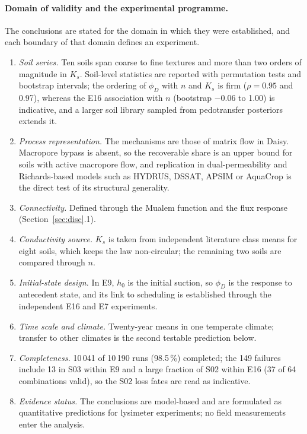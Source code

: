 \paragraph{Domain of validity and the experimental programme.}
The conclusions are stated for the domain in which they were established, and each boundary of that domain defines an experiment.
\begin{enumerate}[nosep]
\item \emph{Soil series.} Ten soils span coarse to fine textures and more than two orders of magnitude in $K_s$. Soil-level statistics are reported with permutation tests and bootstrap intervals; the ordering of $\phi_D$ with $n$ and $K_s$ is firm ($\rho=0.95$ and 0.97), whereas the E16 association with $n$ (bootstrap $-0.06$ to 1.00) is indicative, and a larger soil library sampled from pedotransfer posteriors extends it.
\item \emph{Process representation.} The mechanisms are those of matrix flow in Daisy. Macropore bypass \citep{Jarvis2007,Beven1982} is absent, so the recoverable share is an upper bound for soils with active macropore flow, and replication in dual-permeability and Richards-based models such as HYDRUS, DSSAT, APSIM or AquaCrop \citep{Simunek2008,Simunek2016,Jones2003,Keating2003,Steduto2009} is the direct test of its structural generality.
\item \emph{Connectivity.} Defined through the Mualem function and the flux response (Section~\ref{sec:disc}.1).
\item \emph{Conductivity source.} $K_s$ is taken from independent literature class means for eight soils, which keeps the law non-circular; the remaining two soils are compared through $n$.
\item \emph{Initial-state design.} In E9, $h_0$ is the initial suction, so $\phi_D$ is the response to antecedent state, and its link to scheduling is established through the independent E16 and E7 experiments.
\item \emph{Time scale and climate.} Twenty-year means in one temperate climate; transfer to other climates is the second testable prediction below.
\item \emph{Completeness.} 10\,041 of 10\,190 runs (98.5\,\%) completed; the 149 failures include 13 in S03 within E9 and a large fraction of S02 within E16 (37 of 64 combinations valid), so the S02 loss fates are read as indicative.
\item \emph{Evidence status.} The conclusions are model-based and are formulated as quantitative predictions for lysimeter experiments; no field measurements enter the analysis.
\end{enumerate}

